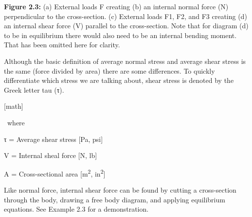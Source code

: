 \documentclass[
  letterpaper,
  DIV=11,
  numbers=noendperiod]{scrreprt}
\begin{document}
\textbf{Figure 2.3:} (a) External loads F creating (b) an internal
normal force (N) perpendicular to the cross-section. (c) External loads
F1, F2, and F3 creating (d) an internal shear force (V) parallel to the
cross-section. Note that for diagram (d) to be in equilibrium there
would also need to be an internal bending moment. That has been omitted
here for clarity.

Although the basic definition of average normal stress and average shear
stress is the same (force divided by area) there are some differences.
To quickly differentiate which stress we are talking about, shear stress
is denoted by the Greek letter tau (τ).

{[}math{]}

\,\,\,where \,\,\,\,\,\,\,\,\,\,\,

τ = Average shear stress {[}Pa, psi{]} \,\,\,\,\,\,\,\,\,\,\,

V = Internal sheal force {[}N, lb{]} \,\,\,\,\,\,\,\,\,\,\,

A = Cross-sectional area {[}m\textsuperscript{2},
in\textsuperscript{2}{]}

Like normal force, internal shear force can be found by cutting a
cross-section through the body, drawing a free body diagram, and
applying equilibrium equations. See Example 2.3 for a demonstration.
\end{document}

